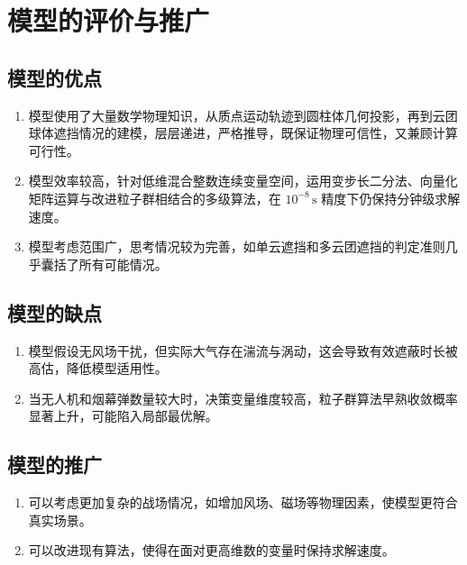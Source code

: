 \documentclass[withoutpreface,bwprint]{cumcmthesis}
\numberwithin{equation}{section} %
\numberwithin{figure}{section} %
\numberwithin{table}{section}  %
\begin{document}

\section{模型的评价与推广}
\vspace{-0.5em}
\subsection{模型的优点}
\begin{enumerate}
  \item 模型使用了大量数学物理知识，从质点运动轨迹到圆柱体几何投影，再到云团球体遮挡情况的建模，层层递进，严格推导，既保证物理可信性，又兼顾计算可行性。
  
  \item 模型效率较高，针对低维混合整数连续变量空间，运用变步长二分法、向量化矩阵运算与改进粒子群相结合的多级算法，在 $10^{-8}\,\mathrm{s}$ 精度下仍保持分钟级求解速度。
  
  \item 模型考虑范围广，思考情况较为完善，如单云遮挡和多云团遮挡的判定准则几乎囊括了所有可能情况。
\end{enumerate}
\vspace{-0.5em}
\subsection{模型的缺点}
\begin{enumerate}
  \item 模型假设无风场干扰，但实际大气存在湍流与涡动，这会导致有效遮蔽时长被高估，降低模型适用性。
  \item 当无人机和烟幕弹数量较大时，决策变量维度较高，粒子群算法早熟收敛概率显著上升，可能陷入局部最优解。
\end{enumerate}
\vspace{-0.5em}
\subsection{模型的推广}
\begin{enumerate}
  \item 可以考虑更加复杂的战场情况，如增加风场、磁场等物理因素，使模型更符合真实场景。
  \item 可以改进现有算法，使得在面对更高维数的变量时保持求解速度。
\end{enumerate}
\end{document}
